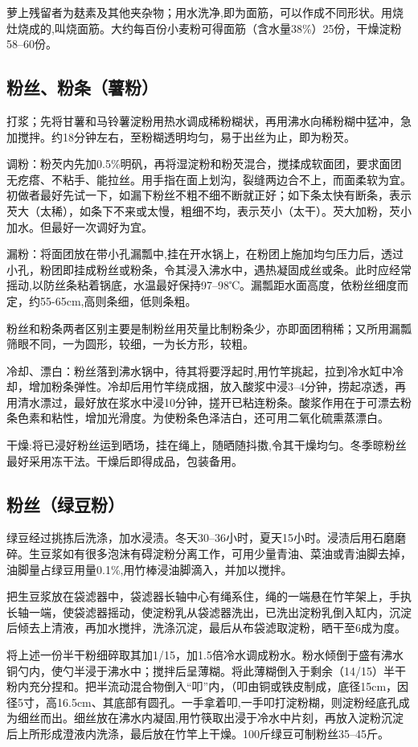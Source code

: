 \documentclass{ctexbook}
\begin{document}
萝上残留者为麸素及其他夹杂物；用水洗净,即为面筋，可以作成不同形状。用烧灶烧成的,叫烧面筋。大约每百份小麦粉可得面筋（含水量38\%）25份，干燥淀粉58--60份。
\subsection{粉丝、粉条（薯粉）}
打浆；先将甘薯和马铃薯淀粉用热水调成稀粉糊状，再用沸水向稀粉糊中猛冲，急加搅拌。约18分钟左右，至粉糊透明均匀，易于出丝为止，即为粉芡。

调粉：粉芡内先加0.5\%明矾，再将湿淀粉和粉芡混合，搅揉成软面团，要求面团无疙瘩、不粘手、能拉丝。用手指在面上划沟，裂缝两边合不上，而面柔软为宜。初做者最好先试一下，如漏下粉丝不粗不细不断就正好；如下条太快有断条，表示芡大（太稀），如条下不来或太慢，粗细不均，表示芡小（太干）。芡大加粉，芡小加水。但最好一次调好为宜。

漏粉：将面团放在带小孔漏瓢中,挂在开水锅上，在粉团上施加均匀压力后，透过小孔，粉团即挂成粉丝或粉条，令其浸入沸水中，遇热凝固成丝或条。此时应经常摇动,以防丝条粘着锅底，水温最好保持97--98℃。漏瓢距水面高度，依粉丝细度而定，约55-65cm,高则条细，低则条粗。

粉丝和粉条两者区别主要是制粉丝用芡量比制粉条少，亦即面团稍稀；又所用漏瓢筛眼不同，一为圆形，较细，一为长方形，较粗。

冷却、漂白：粉丝落到沸水锅中，待其将要浮起时,用竹竿挑起，拉到冷水缸中冷却，增加粉条弹性。冷却后用竹竿绕成捆，放入酸浆中浸3--4分钟，捞起凉透，再用清水漂过，最好放在浆水中浸10分钟，搓开已粘连粉条。酸浆作用在于可漂去粉条色素和粘性，增加光滑度。为使粉条色泽洁白，还可用二氧化硫熏蒸漂白。

干燥:将已浸好粉丝运到晒场，挂在绳上，随晒随抖擞,令其干燥均匀。冬季晾粉丝最好采用冻干法。干燥后即得成品，包装备用。
\subsection{粉丝（绿豆粉）}
绿豆经过挑拣后洗涤，加水浸渍。冬天30--36小时，夏天15小时。浸渍后用石磨磨碎。生豆浆如有很多泡沫有碍淀粉分离工作，可用少量青油、菜油或青油脚去掉，油脚量占绿豆用量0.1\%,用竹棒浸油脚滴入，并加以搅拌。

把生豆浆放在袋滤器中，袋滤器长轴中心有绳系住，绳的一端悬在竹竿架上，手执长轴一端，使袋滤器摇动，使淀粉乳从袋滤器洗出，已洗出淀粉乳倒入缸内，沉淀后倾去上清液，再加水搅拌，洗涤沉淀，最后从布袋滤取淀粉，晒干至6成为度。

将上述一份半干粉细碎取其加1/15，加1.5倍冷水调成粉水。粉水倾倒于盛有沸水铜勺内，使勺半浸于沸水中；搅拌后呈薄糊。将此薄糊倒入于剩余（14/15）半干粉内充分捏和。把半流动混合物倒入“叩”内，（叩由铜或铁皮制成，底径15cm，因径5寸，高16.5cm、其底部有圆孔。一手拿着叩,一手叩打淀粉糊，则淀粉经底孔成为细丝而出。细丝放在沸水内凝固,用竹筷取出浸于冷水中片刻，再放入淀粉沉淀后上所形成澄液内洗涤，最后放在竹竿上干燥。100斤绿豆可制粉丝35--45斤。
\end{document}
